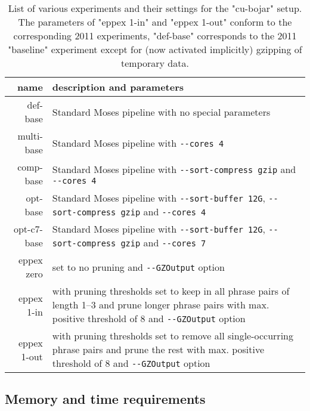 \begin{table}[ht]
\centering
\begin{tabular}{ r p{10cm} }
name & description and parameters \\
\hline
\hline
def-base        & Standard Moses pipeline with no special parameters \\
multi-base      & Standard Moses pipeline with \verb|--cores 4| \\
comp-base       & Standard Moses pipeline with \verb|--sort-compress gzip|
  and \verb|--cores 4| \\
opt-base        & Standard Moses pipeline with \verb|--sort-buffer 12G|,
  \verb|--sort-compress gzip| and \verb|--cores 4| \\
opt-c7-base     & Standard Moses pipeline with \verb|--sort-buffer 12G|,
  \verb|--sort-compress gzip| and \verb|--cores 7| \\
eppex zero      & \eppex{} set to no pruning and \verb|--GZOutput| option \\
eppex 1-in      & \eppex{} with pruning thresholds set to keep in
  all phrase pairs of length 1--3 and prune longer phrase pairs
  with max. positive threshold of 8 and \verb|--GZOutput| option \\
eppex 1-out     & \eppex{} with pruning thresholds set to remove
  all single-occurring phrase pairs and prune the rest with
  max. positive threshold of 8 and \verb|--GZOutput| option \\
\hline
\hline
\end{tabular}
\caption{\label{cu-bojar-scenarios}List of various experiments and their
settings for the "cu-bojar" setup. The parameters of "eppex 1-in" and "eppex 1-out"
conform to the corresponding 2011 experiments, "def-base" corresponds to the 2011
"baseline" experiment except for (now activated implicitly) gzipping of
temporary data.}
\end{table}

\subsection{Memory and time requirements}


